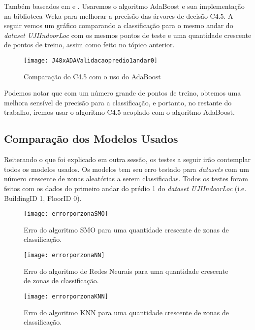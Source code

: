 Também baseados em \cite{comparative} e \cite{comparativeEN}. Usaremos o algoritmo AdaBoost  e sua implementação na biblioteca Weka para melhorar a precisão das árvores de decisão C4.5. A seguir vemos um gráfico comparando a classificação para o mesmo andar do \textit{dataset UJIIndoorLoc} com os mesmos pontos de teste e uma quantidade crescente de pontos de treino, assim como feito no tópico anterior.


\begin{figure}[!h]
\centering
\caption{Comparação do C4.5 com o uso do AdaBoost}
 \texttt{[image: J48xADAValidacaopredio1andar0]}
\label{fig:euclidian}  
\end{figure}


Podemos notar que com um número grande de pontos de treino, obtemos uma melhora sensível de precisão para a classificação, e portanto, no restante do trabalho, iremos usar o algoritmo C4.5 acoplado com o algoritmo AdaBoost.



\subsection{Comparação dos Modelos Usados}


Reiterando o que foi explicado em outra sessão, os testes a seguir irão contemplar todos os modelos usados. Os modelos tem seu erro testado para \textit{datasets} com um número crescente de zonas aleatórias a serem classificadas. Todos os testes foram feitos com os dados do primeiro andar do prédio 1 do \textit{dataset UJIIndoorLoc }(i.e. BuildingID 1, FloorID 0).


\begin{figure}[!h]
	\centering
	\caption{Erro do algoritmo SMO  para uma quantidade crescente de zonas de classificação.}
  \texttt{[image: errorporzonaSMO]}
\label{fig:zonaSMO}  

\end{figure}



\begin{figure}[!h]
	\centering
	\caption{Erro do algoritmo de Redes Neurais  para uma quantidade crescente de zonas de classificação.}
  \texttt{[image: errorporzonaNN]}
\label{fig:zonaNN}  

\end{figure}


\begin{figure}[!h]
	\centering
	\caption{Erro do algoritmo KNN para uma quantidade crescente de zonas de classificação.}
  \texttt{[image: errorporzonaKNN]}
\label{fig:zonaKNN}  

\end{figure}




